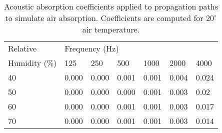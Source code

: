 \begin{table}[htbp]
    \centering
    \caption[Acoustic air absorption coefficients]{Acoustic absorption coefficients applied to propagation paths to simulate air absorption. Coefficients are computed for $20^\circ$ air temperature.}\label{tab:air-absorption}
    \begin{tabular}{@{}lllllll@{}}
    \toprule
    Relative                  & \multicolumn{6}{l}{Frequency (Hz)}              \\  
    Humidity (\%)             & 125    & 250   & 500   & 1000   & 2000   & 4000 \\ \midrule
    40                        & 0.000  & 0.000 & 0.001 & 0.001 & 0.004 & 0.024  \\
    50                        & 0.000  & 0.000 & 0.000 & 0.001 & 0.003 & 0.02   \\
    60                        & 0.000  & 0.000 & 0.001 & 0.001 & 0.003 & 0.017  \\
    70                        & 0.000  & 0.000 & 0.001 & 0.001 & 0.003 & 0.014  \\ \bottomrule
    \end{tabular}
\end{table}